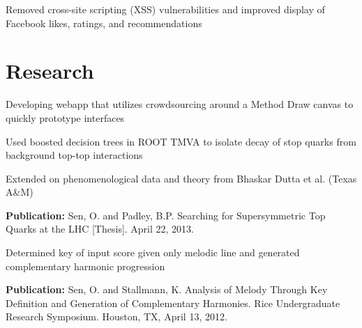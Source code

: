 \documentclass{onkursen-resume}
\begin{document}
\begin{itemize*}
\item Removed cross-site scripting (XSS) vulnerabilities and improved display of Facebook likes, ratings, and recommendations
\end{itemize*}

\hr

\section*{Research}

\begin{itemize*}
\item Developing webapp that utilizes crowdsourcing around a Method Draw canvas to quickly prototype interfaces
\end{itemize*}

\begin{itemize*}
\item Used boosted decision trees in ROOT TMVA to isolate decay of stop quarks from background top-top interactions
\item Extended on phenomenological data and theory from Bhaskar Dutta et al. (Texas A\&M)
\item {\bf Publication:} Sen, O. and Padley, B.P. Searching for Supersymmetric Top Quarks at the LHC [Thesis]. April 22, 2013.
\end{itemize*}


\begin{itemize*}
\item Determined key of input score given only melodic line and generated complementary harmonic progression
\item {\bf Publication:} Sen, O. and Stallmann, K. Analysis of Melody Through Key Definition and Generation of Complementary Harmonies. Rice Undergraduate Research Symposium. Houston, TX, April 13, 2012.
\end{itemize*}

\end{document}
